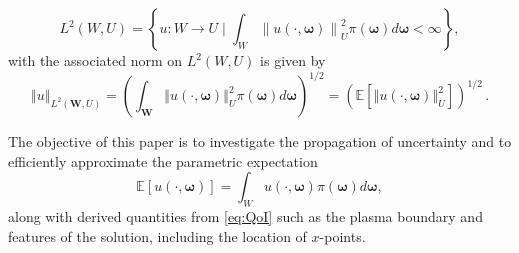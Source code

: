 \[
L^2(W,U) = \left\{u:W\rightarrow U\; \bigg\vert \;\int_{W}\left\|u(\cdot,\boldsymbol{\omega})\right\|_{U}^2\pi(\boldsymbol{\omega})d\boldsymbol{\omega}<\infty\right\},
\]
%
with the associated norm on $L^2(W,U)$ is given by
%
\[
\left\Vert u \right\Vert_{L^2(\boldsymbol W,U)} =
    \left(\int_{\boldsymbol W} \left\Vert u(\cdot,\boldsymbol{\omega})  \right\Vert_{U}^2 \pi(\boldsymbol{\omega})d\boldsymbol{\omega} \right)^{1/2} = \left(\mathbb{E}\left[\left\Vert u(\cdot,\boldsymbol{\omega})  \right\Vert_{U}^2\right]\right)^{1/2}\,. 
\]
%

The objective of this paper is to investigate the propagation of uncertainty and to efficiently approximate the parametric expectation
%
 \begin{equation}
 \label{eq:QoI}
      \mathbb{E}\left[u(\cdot,\boldsymbol \omega)\right]=\int_W u(\cdot,\boldsymbol{\omega})\pi(\boldsymbol\omega)d\boldsymbol{\omega},
 \end{equation}
%
along with derived quantities from \eqref{eq:QoI} such as the plasma boundary and features of the solution, including the location of $x$-points.







